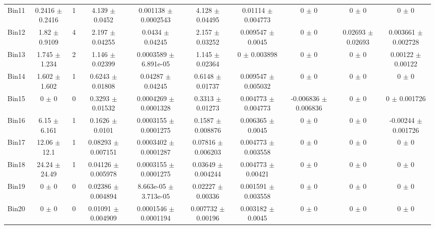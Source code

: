 \begin{tabular}{@{\extracolsep{4pt}}lccccccccc@{}}
     Bin11 & 0.2416 $\pm$ 0.2416 & 1 & 4.139 $\pm$ 0.0452 & 0.001138 $\pm$ 0.0002543 & 4.128 $\pm$ 0.04495 & 0.01114 $\pm$ 0.004773 & 0 $\pm$ 0 & 0 $\pm$ 0 & 0 $\pm$ 0 \\ 
     Bin12 & 1.82 $\pm$ 0.9109 & 4 & 2.197 $\pm$ 0.04255 & 0.0434 $\pm$ 0.04245 & 2.157 $\pm$ 0.03252 & 0.009547 $\pm$ 0.0045 & 0 $\pm$ 0 & 0.02693 $\pm$ 0.02693 & 0.003661 $\pm$ 0.002728 \\ 
     Bin13 & 1.745 $\pm$ 1.234 & 2 & 1.146 $\pm$ 0.02399 & 0.0003589 $\pm$ 6.891e-05 & 1.145 $\pm$ 0.02364 & 0 $\pm$ 0.003898 & 0 $\pm$ 0 & 0 $\pm$ 0 & 0.00122 $\pm$ 0.00122 \\ 
     Bin14 & 1.602 $\pm$ 1.602 & 1 & 0.6243 $\pm$ 0.01808 & 0.04287 $\pm$ 0.04245 & 0.6148 $\pm$ 0.01737 & 0.009547 $\pm$ 0.005032 & 0 $\pm$ 0 & 0 $\pm$ 0 & 0 $\pm$ 0 \\ 
     Bin15 & 0 $\pm$ 0 & 0 & 0.3293 $\pm$ 0.01532 & 0.0004269 $\pm$ 0.0001328 & 0.3313 $\pm$ 0.01273 & 0.004773 $\pm$ 0.004773 & -0.006836 $\pm$ 0.006836 & 0 $\pm$ 0 & 0 $\pm$ 0.001726 \\ 
     Bin16 & 6.15 $\pm$ 6.161 & 1 & 0.1626 $\pm$ 0.0101 & 0.0003155 $\pm$ 0.0001275 & 0.1587 $\pm$ 0.008876 & 0.006365 $\pm$ 0.0045 & 0 $\pm$ 0 & 0 $\pm$ 0 & -0.00244 $\pm$ 0.001726 \\ 
     Bin17 & 12.06 $\pm$ 12.1 & 1 & 0.08293 $\pm$ 0.007151 & 0.0003402 $\pm$ 0.0001287 & 0.07816 $\pm$ 0.006203 & 0.004773 $\pm$ 0.003558 & 0 $\pm$ 0 & 0 $\pm$ 0 & 0 $\pm$ 0 \\ 
     Bin18 & 24.24 $\pm$ 24.49 & 1 & 0.04126 $\pm$ 0.005978 & 0.0003155 $\pm$ 0.0001275 & 0.03649 $\pm$ 0.004244 & 0.004773 $\pm$ 0.00421 & 0 $\pm$ 0 & 0 $\pm$ 0 & 0 $\pm$ 0 \\ 
     Bin19 & 0 $\pm$ 0 & 0 & 0.02386 $\pm$ 0.004894 & 8.663e-05 $\pm$ 3.713e-05 & 0.02227 $\pm$ 0.00336 & 0.001591 $\pm$ 0.003558 & 0 $\pm$ 0 & 0 $\pm$ 0 & 0 $\pm$ 0 \\ 
     Bin20 & 0 $\pm$ 0 & 0 & 0.01091 $\pm$ 0.004909 & 0.0001546 $\pm$ 0.0001194 & 0.007732 $\pm$ 0.00196 & 0.003182 $\pm$ 0.0045 & 0 $\pm$ 0 & 0 $\pm$ 0 & 0 $\pm$ 0 \\ 
\hline\hline
  \end{tabular}
